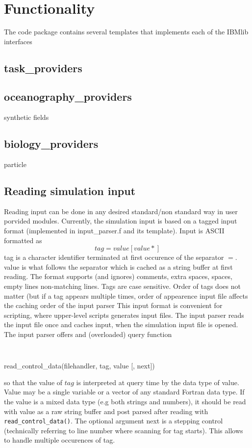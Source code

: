 \chapter{Functionality}

The code package contains several templates that 
implements each of the IBMlib interfaces
\section{task\_providers}
\section{oceanography\_providers}
synthetic fields
\section{biology\_providers}
particle

\section{Reading simulation input}
Reading input can be done in any desired standard/non standard way
in user porvided modules. Currently, the simulation input is based on
a tagged input format (implemented in input\_parser.f and its 
template). Input is ASCII formatted as  
\begin{equation}
tag = value [value*] \nonumber
\end{equation}
tag is a character identifier terminated at first occurence of 
the separator $=$. value is what follows the separator which
is cached as a string buffer at first reading. 
The format supports (and ignores) comments, extra spaces, spaces, 
empty lines non-matching lines. Tags are case sensitive.
Order of tags does not matter (but if a tag appears multiple times,
order of appearence input file affects the caching order of the input parser
This input format is convenient for scripting, where upper-level  
scripts generates input files.
The input parser reads the input file once and caches input, when 
the simulation input file is opened. 
The input parser offers and (overloaded) query function
\begin{itemize}
{\tt 
\item read\_control\_data(filehandler, tag, value [, next]) 
}
\end{itemize}
so that the value of $tag$ is interpreted at query time by the
data type of value. Value may be a single variable or a vector
of any standard Fortran data type. If the value is a mixed
data type (e.g both strings and numbers), it should be read
with value as a raw string buffer and post parsed after reading
with {\tt read\_control\_data()}. The optional argument next
is a stepping control (technically referring to line number where scanning for 
tag starts). This allows to handle multiple occurences of tag.


